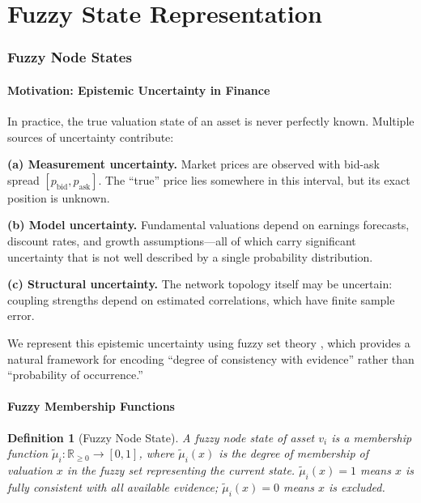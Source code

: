 \documentclass[twocolumn,10pt]{article}
\newtheorem{definition}[theorem]{Definition}
\theoremstyle{remark}
\newcommand{\fuzzyset}[1]{\tilde{\mu}_{#1}}
\begin{document}
\part{Fuzzy State Representation}

\section{Fuzzy Node States}
\label{sec:fuzzy_states}

\subsection{Motivation: Epistemic Uncertainty in Finance}

In practice, the true valuation state of an asset is never perfectly known.  Multiple sources of uncertainty contribute:

\textbf{(a) Measurement uncertainty.}  Market prices are observed with bid-ask spread $[p_{\text{bid}}, p_{\text{ask}}]$.  The ``true'' price lies somewhere in this interval, but its exact position is unknown.

\textbf{(b) Model uncertainty.}  Fundamental valuations depend on earnings forecasts, discount rates, and growth assumptions---all of which carry significant uncertainty that is not well described by a single probability distribution.

\textbf{(c) Structural uncertainty.}  The network topology itself may be uncertain: coupling strengths depend on estimated correlations, which have finite sample error.

We represent this epistemic uncertainty using fuzzy set theory \cite{zadeh1965}, which provides a natural framework for encoding ``degree of consistency with evidence'' rather than ``probability of occurrence.''

\subsection{Fuzzy Membership Functions}

\begin{definition}[Fuzzy Node State]
\label{def:fuzzy_state}
A \emph{fuzzy node state} of asset $v_i$ is a membership function $\fuzzyset{i} : \mathbb{R}_{\geq 0} \to [0,1]$, where $\fuzzyset{i}(x)$ is the degree of membership of valuation $x$ in the fuzzy set representing the current state.  $\fuzzyset{i}(x) = 1$ means $x$ is fully consistent with all available evidence; $\fuzzyset{i}(x) = 0$ means $x$ is excluded.
\end{definition}
\end{document}
